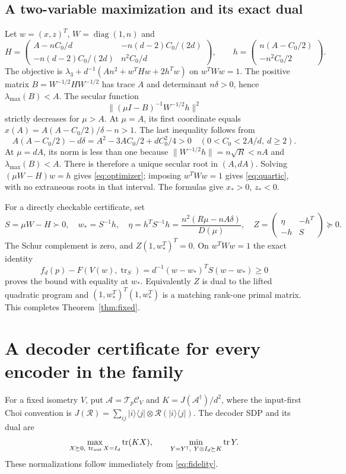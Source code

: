 \documentclass[11pt]{article}
\newcommand{\tr}{\operatorname{tr}}
\newcommand{\ket}[1]{\lvert#1\rangle}
\newcommand{\bra}[1]{\langle#1\rvert}
\newcommand{\T}{\mathcal T}
\newcommand{\R}{\mathcal R}
\newcommand{\C}{\mathcal C}
\newcommand{\norm}[1]{\lVert#1\rVert}
\begin{document}
\subsection{A two-variable maximization and its exact dual}
Let $w=(x,z)^T$, $W=\operatorname{diag}(1,n)$ and
\[
 H=\begin{pmatrix}
 A-nC_0/d&-n(d-2)C_0/(2d)\\
 -n(d-2)C_0/(2d)&n^2C_0/d
 \end{pmatrix},\qquad
 h=\begin{pmatrix}n(A-C_0/2)\\-n^2C_0/2\end{pmatrix}.
\]
The objective is $\lambda_3+d^{-1}(An^2+w^THw+2h^Tw)$ on $w^TWw=1$.
The positive matrix $B=W^{-1/2}HW^{-1/2}$ has trace $A$ and determinant
$n\delta>0$, hence $\lambda_{\max}(B)<A$. The secular function
\[
 \norm{(\mu I-B)^{-1}W^{-1/2}h}^2
\]
strictly decreases for $\mu>A$. At $\mu=A$, its first coordinate equals
$x(A)=A(A-C_0/2)/\delta-n>1$. The last inequality follows from
\[
 A(A-C_0/2)-d\delta=A^2-3AC_0/2+dC_0^2/4>0
 \quad(0<C_0<2A/d,\ d\ge2).
\]
At $\mu=dA$, its norm is less than one because
$\norm{W^{-1/2}h}=n\sqrt R<nA$ and $\lambda_{\max}(B)<A$.
There is therefore a unique secular root in $(A,dA)$. Solving
$(\mu W-H)w=h$ gives \eqref{eq:optimizer}; imposing $w^TWw=1$ gives
\eqref{eq:quartic}, with no extraneous roots in that interval.
The formulas give $x_*>0$, $z_*<0$.

For a directly checkable certificate, set
\begin{equation}\label{eq:certificate}
 S=\mu W-H\succ0,\quad w_*=S^{-1}h,\quad
 \eta=h^TS^{-1}h=\frac{n^2(R\mu-nA\delta)}{D(\mu)},\quad
 Z=\begin{pmatrix}\eta&-h^T\\-h&S\end{pmatrix}\succeq0.
\end{equation}
The Schur complement is zero, and
$Z(1,w_*^T)^T=0$. On $w^TWw=1$ the exact identity
\begin{equation}\label{eq:gap}
 f_d(p)-F(V(w),\tr_S)=d^{-1}(w-w_*)^TS(w-w_*)\ge0
\end{equation}
proves the bound with equality at $w_*$. Equivalently $Z$ is dual to
the lifted quadratic program and $(1,w_*^T)^T(1,w_*^T)$ is a matching
rank-one primal matrix. This completes Theorem~\ref{thm:fixed}.

\section{A decoder certificate for every encoder in the family}
For a fixed isometry $V$, put $\mathcal A=\T_p\C_V$ and
$K=J(\mathcal A^\dagger)/d^2$, where the input-first Choi convention is
$J(\R)=\sum_{ij}\ket i\bra j\otimes\R(\ket i\bra j)$.
The decoder SDP and its dual are
\begin{equation}\label{eq:decoder-sdp}
 \max_{X\succeq0,\ \tr_{\rm out}X=I_d}\tr(KX),\qquad
 \min_{Y=Y^\dagger,\ Y\otimes I_d\succeq K}\tr Y.
\end{equation}
These normalizations follow immediately from \eqref{eq:fidelity}.
\end{document}

